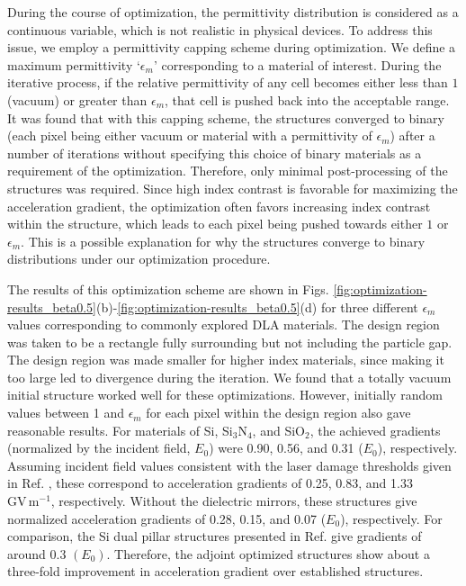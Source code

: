 During the course of optimization, the permittivity distribution is considered as a continuous variable, which is not realistic in physical devices.
To address this issue, we employ a permittivity capping scheme during optimization.
We define a maximum permittivity `$\epsilon_m$' corresponding to a material of interest.
During the iterative process, if the relative permittivity of any cell becomes either less than $1$ (vacuum) or greater than $\epsilon_m$, that cell is pushed back into the acceptable range.
It was found that with this capping scheme, the structures converged to binary (each pixel being either vacuum or material with a permittivity of $\epsilon_m$) after a number of iterations without specifying this choice of binary materials as a requirement of the optimization.
Therefore, only minimal post-processing of the structures was required.
Since high index contrast is favorable for maximizing the acceleration gradient, the optimization often favors increasing index contrast within the structure, which leads to each pixel being pushed towards either $1$ or $\epsilon_m$.
This is a possible explanation for why the structures converge to binary distributions under our optimization procedure.

The results of this optimization scheme are shown in Figs. \ref{fig:optimization-results_beta0.5}(b)-\ref{fig:optimization-results_beta0.5}(d) for three different $\epsilon_m$ values corresponding to commonly explored DLA materials.
The design region was taken to be a rectangle fully surrounding but not including the particle gap.
The design region was made smaller for higher index materials, since making it too large led to divergence during the iteration.
We found that a totally vacuum initial structure worked well for these optimizations.
However, initially random values between 1 and $\epsilon_m$ for each pixel within the design region also gave reasonable results.
For materials of Si, Si$_3$N$_4$, and SiO$_2$, the achieved gradients (normalized by the incident field, $E_0$) were 0.90, 0.56, and 0.31 ($E_0$), respectively.
Assuming incident field values consistent with the laser damage thresholds given in Ref. \cite{soong2012laser}, these correspond to acceleration gradients of 0.25, 0.83, and 1.33 $\textrm{GV}\,\textrm{m}^{-1}$, respectively.
Without the dielectric mirrors, these structures give normalized acceleration gradients of 0.28, 0.15, and 0.07 ($E_0$), respectively.
For comparison, the Si dual pillar structures presented in Ref. \cite{leedle2015dielectric} give gradients of around 0.3 $(E_0)$.
Therefore, the adjoint optimized structures show about a three-fold improvement in acceleration gradient over established structures.

